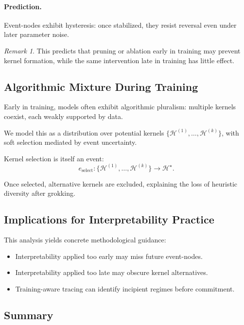 \documentclass[11pt]{article}
\theoremstyle{remark}
\newtheorem{remark}{Remark}
\newcommand{\Hist}{\mathcal{H}}
\begin{document}
\paragraph{Prediction.}
Event-nodes exhibit hysteresis: once stabilized, they resist reversal
even under later parameter noise.

\begin{remark}
This predicts that pruning or ablation early in training may prevent
kernel formation, while the same intervention late in training has
little effect.
\end{remark}

\subsection{Algorithmic Mixture During Training}

Early in training, models often exhibit algorithmic pluralism: multiple
kernels coexist, each weakly supported by data.

We model this as a distribution over potential kernels
$\{\Hist^{(1)}, \ldots, \Hist^{(k)}\}$, with soft selection mediated by
event uncertainty.

Kernel selection is itself an event:
\[
e_{\text{select}}: \{\Hist^{(1)}, \ldots, \Hist^{(k)}\} \to \Hist^\star.
\]

Once selected, alternative kernels are excluded, explaining the loss
of heuristic diversity after grokking.

\subsection{Implications for Interpretability Practice}

This analysis yields concrete methodological guidance:

\begin{itemize}
\item Interpretability applied too early may miss future event-nodes.
\item Interpretability applied too late may obscure kernel alternatives.
\item Training-aware tracing can identify incipient regimes before
commitment.
\end{itemize}

\subsection{Summary}
\end{document}
